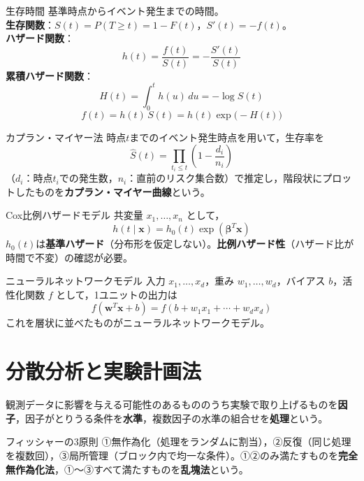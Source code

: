 \documentclass[a4paper,11pt]{ltjsarticle}
\begin{document}
\begin{term}{生存時間}
基準時点からイベント発生までの時間。\\
\textbf{生存関数}：$S(t)=P(T\ge t)=1-F(t)$，$S'(t)=-f(t)$。\\
\textbf{ハザード関数}：
\[
h(t) = \frac{f(t)}{S(t)} = -\frac{S'(t)}{S(t)}
\]
\textbf{累積ハザード関数}：
\[
H(t) = \int_0^t h(u)\,du = -\log S(t)
\]
\[
f(t) = h(t)\,S(t) = h(t)\exp\big(-H(t)\big)
\]
\end{term}

\begin{term}{カプラン・マイヤー法}
時点$t$までのイベント発生時点を用いて，生存率を
\[
\hat S(t) = \prod_{t_i\le t}\left(1-\frac{d_i}{n_i}\right)
\]
（$d_i$：時点$t_i$での発生数，$n_i$：直前のリスク集合数）で推定し，階段状にプロットしたものを\textbf{カプラン・マイヤー曲線}という。
\end{term}

\begin{term}{Cox比例ハザードモデル}
共変量 $x_1,\dots,x_n$ として，
\[
h(t\mid \bm x) = h_0(t)\exp(\bm\beta^T\bm x)
\]
$h_0(t)$は\textbf{基準ハザード}（分布形を仮定しない）。\textbf{比例ハザード性}（ハザード比が時間で不変）の確認が必要。
\end{term}

\begin{term}{ニューラルネットワークモデル}
入力 $x_1,\dots,x_d$，重み $w_1,\dots,w_d$，バイアス $b$，活性化関数 $f$ として，1ユニットの出力は
\[
f(\bm w^T\bm x+b) = f(b+w_1x_1+\cdots+w_dx_d)
\]
これを層状に並べたものがニューラルネットワークモデル。
\end{term}


\section{分散分析と実験計画法}

観測データに影響を与える可能性のあるもののうち実験で取り上げるものを\textbf{因子}，因子がとりうる条件を\textbf{水準}，複数因子の水準の組合せを\textbf{処理}という。

\begin{term}{フィッシャーの3原則}
①無作為化（処理をランダムに割当），②反復（同じ処理を複数回），③局所管理（ブロック内で均一な条件）。①②のみ満たすものを\textbf{完全無作為化法}，①〜③すべて満たすものを\textbf{乱塊法}という。
\end{term}
\end{document}

